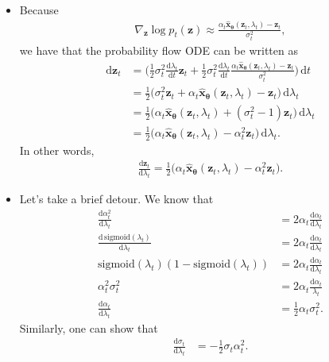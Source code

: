 \documentclass[10pt]{article}
\newcommand{\dee}{\mathrm{d}}
\newcommand{\ve}[1]{\mathbf{#1}}
\newcommand{\ves}[1]{\boldsymbol{#1}}
\newcommand{\mrm}[1]{\mathrm{#1}}
\begin{document}
\begin{itemize}
  \item Because
  \begin{align*}
    \nabla_{\ve{z}} \log p_t(\ve{z}) \approx \frac{\alpha_t \hat{\ve{x}}_{\ves{\theta}}(\ve{z}_t, \lambda_t) - \ve{z}_t}{\sigma_t^2},
  \end{align*}
  we have that the probability flow ODE can be written as
  \begin{align*}
    \dee\ve{z}_t 
    &= \bigg( \frac{1}{2} \sigma_t^2 \frac{\dee \lambda_t}{\dee t} \ve{z}_t + \frac{1}{2} \sigma_t^2 \frac{\dee\lambda_t}{\dee t} \frac{\alpha_t \hat{\ve{x}}_{\ves{\theta}}(\ve{z}_t, \lambda_t) - \ve{z}_t}{\sigma_t^2} \bigg)\, \dee t \\
    &= \frac{1}{2} \Big( \sigma_t^2 \ve{z}_t + \alpha_t \hat{\ve{x}}_{\ves{\theta}}(\ve{z}_t, \lambda_t) - \ve{z}_t \Big)\, \dee\lambda_t \\
    &= \frac{1}{2} \Big( \alpha_t \hat{\ve{x}}_{\ves{\theta}}(\ve{z}_t, \lambda_t) + (\sigma_t^2 - 1)\ve{z}_t \Big)\, \dee\lambda_t \\
    &= \frac{1}{2} \Big( \alpha_t \hat{\ve{x}}_{\ves{\theta}}(\ve{z}_t, \lambda_t) - \alpha_t^2 \ve{z}_t \Big)\, \dee\lambda_t.
  \end{align*}
  In other words,
  \begin{align*}
    \frac{\dee \ve{z}_t}{\dee \lambda_t} = \frac{1}{2} \Big( \alpha_t \hat{\ve{x}}_{\ves{\theta}}(\ve{z}_t, \lambda_t) - \alpha_t^2 \ve{z}_t \Big).
  \end{align*}
  
  \item Let's take a brief detour. We know that
  \begin{align*}
    \frac{\dee \alpha_t^2}{\dee \lambda_t} &= 2 \alpha_t \frac{\dee \alpha_t}{\dee \lambda_t} \\
    \frac{\dee\, \mrm{sigmoid}(\lambda_t)}{\dee \lambda_t} &=  2 \alpha_t \frac{\dee \alpha_t}{\dee \lambda_t} \\
    \mrm{sigmoid}(\lambda_t)(1 - \mrm{sigmoid}(\lambda_t)) &=  2 \alpha_t \frac{\dee \alpha_t}{\dee \lambda_t} \\
    \alpha_t^2 \sigma_t^2 &= 2 \alpha_t \frac{\dee \alpha_t}{\lambda_t} \\
    \frac{\dee \alpha_t}{\dee \lambda_t} &= \frac{1}{2} \alpha_t \sigma_t^2.
  \end{align*}
  Similarly, one can show that
  \begin{align*}
    \frac{\dee \sigma_t}{\dee \lambda_t} &= -\frac{1}{2} \sigma_t \alpha_t^2.
  \end{align*}
    


\end{itemize}
\end{document}
